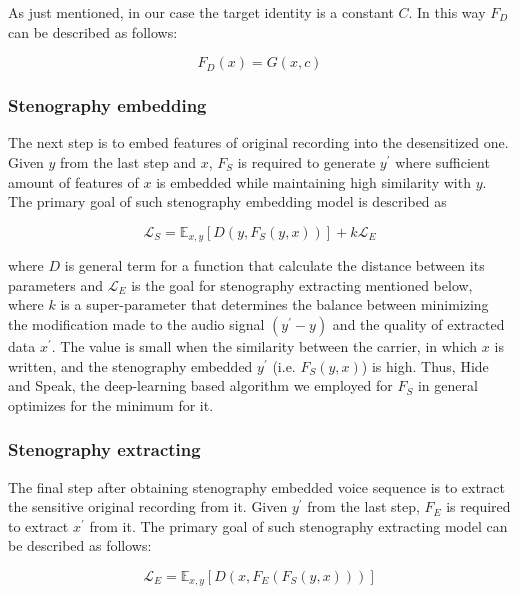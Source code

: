 \documentclass[journal]{IEEEtran} %
\begin{document}
As just mentioned, in our case the target identity is a constant $C$. In this way $F_D$ can be described as follows:

\begin{equation}
    \label{eqn:fd_val}
    F_D(x) = G(x, c)
\end{equation}

\subsubsection{Stenography embedding}

The next step is to embed features of original recording into the desensitized one. Given $y$ from the last step and $x$, $F_S$ is required to generate $y^{\prime}$ where sufficient amount of features of $x$ is embedded while maintaining high similarity with $y$. The primary goal of such stenography embedding model is described as

\begin{equation}
    \label{eqn:embed_loss}
    \mathcal{L}_S = \mathbb{E}_{x, y}[D(y, F_S(y, x))] + k\mathcal{L}_E
\end{equation}

where $D$ is general term for a function that calculate the distance between its parameters and $\mathcal{L}_E$ is the goal for stenography extracting mentioned below, where $k$ is a super-parameter that determines the balance between minimizing the modification made to the audio signal $(y^{\prime} - y)$ and the quality of extracted data $x^{\prime}$. The value is small when the similarity between the carrier, in which $x$ is written, and the stenography embedded $y^{\prime}$ (i.e. $F_S(y, x)$) is high. Thus, Hide and Speak, the deep-learning based algorithm we employed for $F_S$ in general optimizes for the minimum for it.

\subsubsection{Stenography extracting}

The final step after obtaining stenography embedded voice sequence is to extract the sensitive original recording from it. Given $y^{\prime}$ from the last step, $F_E$ is required to extract $x^{\prime}$ from it. The primary goal of such stenography extracting model can be described as follows:

\begin{equation}
    \label{eqn:extract_loss}
    \mathcal{L}_E = \mathbb{E}_{x, y}[D(x, F_E(F_S(y, x)))]
\end{equation}
\end{document}
